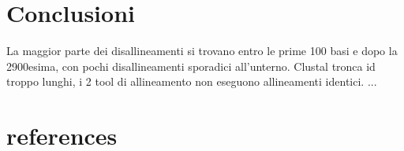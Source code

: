\documentclass[11pt,italian]{article}
\begin{document}
\section{Conclusioni}
La maggior parte dei disallineamenti si trovano entro le prime 100 basi e dopo la 2900esima, con pochi disallineamenti sporadici all'unterno.\newline
Clustal tronca id troppo lunghi, i 2 tool di allineamento non eseguono allineamenti identici.\newline
...
\section{references}
\end{document}
